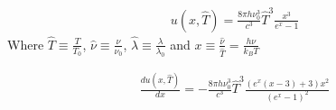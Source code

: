 \documentclass[12pt]{article}
\begin{document}
  \clearpage

  \begin{align}
    u(x,\hat{T}) = \frac{8\pi h \nu_0^3}{c^3}\hat{T}^3\frac{x^3}{e^x-1} \nonumber
  \end{align}
  Where $\hat{T} \equiv \frac{T}{T_0}$, $\hat{\nu} \equiv \frac{\nu}{\nu_0}$,
  $\hat{\lambda} \equiv \frac{\lambda}{\lambda_0}$ and $x \equiv \frac{\hat{\nu}}{\hat{T}} = \frac{h\nu}{k_BT}$

  \begin{align}
    \frac{du(x,\hat{T})}{dx} = -\frac{8\pi h \nu_0^3}{c^3}\hat{T}^3\frac{(e^x(x-3)+3)x^2}{(e^x-1)^2} \nonumber
  \end{align}

  
\end{document}
